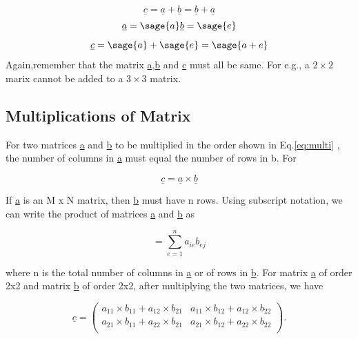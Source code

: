 \documentclass[12pt]{report}
\newcommand{\lab}[1]{
	Eq.\ref{#1}
}
\begin{document}
\begin{equation}
	\underline{c}=\underline{a}+
	\underline{b}= \underline{b}+\underline{a} 
\end{equation}
	$$\underline{a}=\sage{a}
	\underline{b}=\sage{e}$$
	$$\underline{c}=\sage{a} + \sage{e}=\sage{a+e}$$
Again,remember that the matrix 
\underline{a},\underline{b} and \underline{c} must 
all be same. For e.g., a $ 2 \times 2 $ 
marix cannot be added to a $ 3 \times 3 $ matrix.


\subsection{Multiplications of Matrix}

For two matrices \underline{a} and \underline{b}
to be multiplied in the order shown in \lab{eq:multi},
the number of columns in \underline{a} must equal the
number of rows in b. For

\begin{equation}
	\underline{c} = \underline{a} \times \underline{b}	
	\label{eq:multi}
\end{equation}

If \underline{a} is an M x N matrix,
then \underline{b} must have n
rows. Using subscript notation, 
we can write the product of matrices
\underline{a} and \underline{b} as

\begin{equation}
	[c_{{ij}}] = \sum_{e=1}^{n} {a_{ie}}{b_{ej}}
\end  {equation}

where n is the total number of columns in \underline{a} or of rows in
\underline{b}. For matrix \underline{a} of order 2x2 and matrix
\underline{b} of order 2x2, after multiplying the two matrices, we
have

\begin{equation}
	\underline{c}=\left(\begin{array}{rrrrrr}
	a_{11} \times b_{11} + a_{12} \times b_{21} & a_{11} \times b_{12} + a_{12} \times b_{22}\\
	a_{21} \times b_{11} + a_{22} \times b_{21} & a_{21} \times b_{12} + a_{22} \times b_{22}\\
\end{array}\right).
\end{equation}
\end{document}
